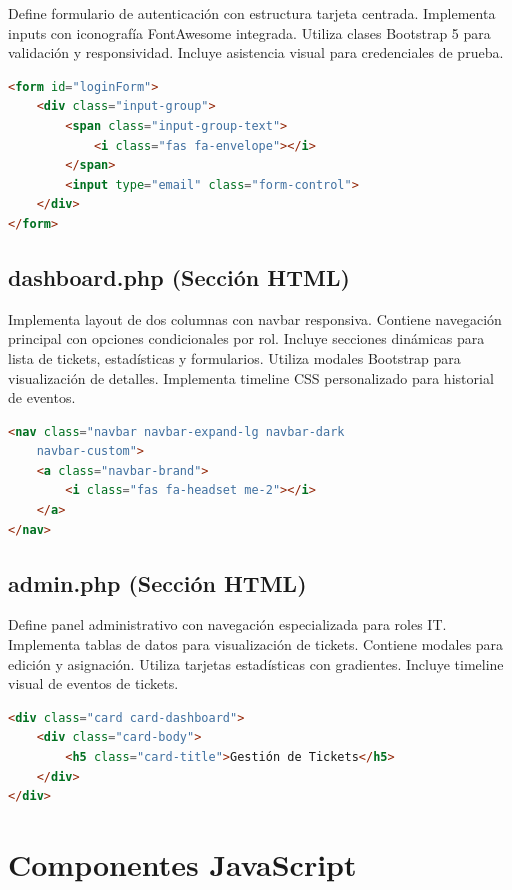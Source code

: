 \documentclass[12pt,a4paper]{article}
\begin{document}
Define formulario de autenticación con estructura tarjeta centrada. Implementa inputs con iconografía FontAwesome integrada. Utiliza clases Bootstrap 5 para validación y responsividad. Incluye asistencia visual para credenciales de prueba.

\begin{lstlisting}[language=HTML,caption={Formulario login}]
<form id="loginForm">
    <div class="input-group">
        <span class="input-group-text">
            <i class="fas fa-envelope"></i>
        </span>
        <input type="email" class="form-control">
    </div>
</form>
\end{lstlisting}

\subsection{dashboard.php (Sección HTML)}

Implementa layout de dos columnas con navbar responsiva. Contiene navegación principal con opciones condicionales por rol. Incluye secciones dinámicas para lista de tickets, estadísticas y formularios. Utiliza modales Bootstrap para visualización de detalles. Implementa timeline CSS personalizado para historial de eventos.

\begin{lstlisting}[language=HTML,caption={Navbar dashboard}]
<nav class="navbar navbar-expand-lg navbar-dark 
    navbar-custom">
    <a class="navbar-brand">
        <i class="fas fa-headset me-2"></i>
    </a>
</nav>
\end{lstlisting}

\subsection{admin.php (Sección HTML)}

Define panel administrativo con navegación especializada para roles IT. Implementa tablas de datos para visualización de tickets. Contiene modales para edición y asignación. Utiliza tarjetas estadísticas con gradientes. Incluye timeline visual de eventos de tickets.

\begin{lstlisting}[language=HTML,caption={Panel admin}]
<div class="card card-dashboard">
    <div class="card-body">
        <h5 class="card-title">Gestión de Tickets</h5>
    </div>
</div>
\end{lstlisting}

\section{Componentes JavaScript}
\end{document}
